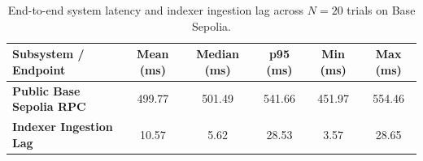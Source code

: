 \begin{table}[t]
\centering
\small
\caption{End-to-end system latency and indexer ingestion lag across $N=20$ trials on Base Sepolia.}
\label{tab:latency}
\begin{tabular}{lccccc}
\hline
\textbf{Subsystem / Endpoint} & \textbf{Mean (ms)} & \textbf{Median (ms)} & \textbf{p95 (ms)} & \textbf{Min (ms)} & \textbf{Max (ms)} \\
\hline
\textbf{Public Base Sepolia RPC} & 499.77 & 501.49 & 541.66 & 451.97 & 554.46 \\
\textbf{Indexer Ingestion Lag} & 10.57 & 5.62 & 28.53 & 3.57 & 28.65 \\
\hline
\end{tabular}
\end{table}
